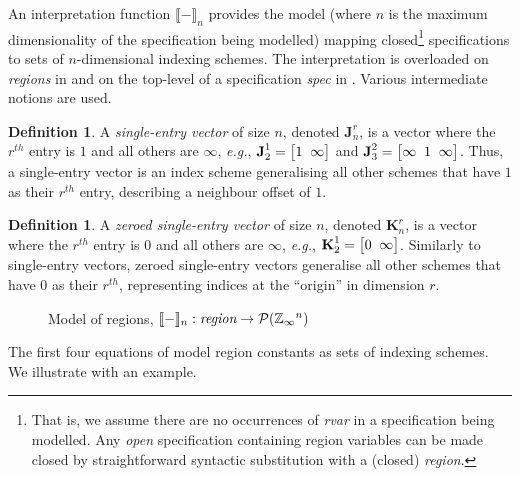 \documentclass[10pt,preprint]{sigplanconf}
\newcounter{block}
\theoremstyle{definition}
\newtheorem{definition}[block]{Definition}
\newcommand{\eg}{\emph{e.g.}}
\newcommand{\interp}[1]{\llbracket{#1}\rrbracket}
\newcommand{\vtwoh}[2]{\setlength{\arraycolsep}{0em}
\left[\begin{array}{cc}#1 \; & \; #2\end{array}\right]}
\newcommand{\vthreeh}[3]{\setlength{\arraycolsep}{0em}
\left[\begin{array}{ccc}#1 \; & \; #2 \; & \; #3\end{array}\right]}
\newcommand{\singleEntry}[2]{\textbf{J}_{#2}^{#1}}
\newcommand{\zeroEntry}[2]{\textbf{K}_{#2}^{#1}}
\begin{document}
An interpretation function $\interp{-}_n$ provides the model 
(where $n$ is the maximum dimensionality of the specification being
modelled) mapping closed\footnote{That is, we assume there are no
  occurrences of \textit{rvar} in a specification being modelled.  Any
  \emph{open} specification containing region variables can be made
  closed by straightforward syntactic substitution with a (closed)
  \textit{region}.} specifications to sets of
$n$-dimensional indexing schemes. The interpretation is overloaded on
\emph{regions} in  and on the top-level
of a specification \textit{spec} in .
Various intermediate notions are used.

\begin{definition}A \emph{single-entry vector} of size $n$, denoted
$\singleEntry{r}{n}$, is a vector where the $r^{th}$ entry is $1$
and all others are $\infty$, \eg{}, $\singleEntry{1}{2} =
\vtwoh{1}{\infty}$ and $\singleEntry{2}{3} = \vthreeh{\infty}{1}{\infty}$.
Thus, a single-entry vector is an index scheme generalising 
all other schemes that have $1$ as their $r^{th}$ entry,
describing a neighbour offset of $1$.
\end{definition}

\begin{definition}
A \emph{zeroed single-entry vector} of size $n$, denoted
$\zeroEntry{r}{n}$, is a vector where the $r^{th}$ entry is $0$ and all others
are $\infty$, \eg{}, $\zeroEntry{1}{2} = \vtwoh{0}{\infty}$.
Similarly to single-entry vectors, zeroed single-entry vectors
generalise all other schemes
that have $0$ as their $r^{th}$, representing indices at
the ``origin'' in dimension $r$.
\end{definition}

\begin{figure}[t]
\vspace{-0.9em}

\caption{Model of regions,
$\interp{-}_n : \textit{region} \rightarrow \mathcal{P}(\domainVal{}^n)$}
\label{fig:region-model}
\vspace{-1em}
\end{figure}

\noindent
The first four equations of 
model region constants as sets of indexing
schemes. We illustrate with an example.
\end{document}
